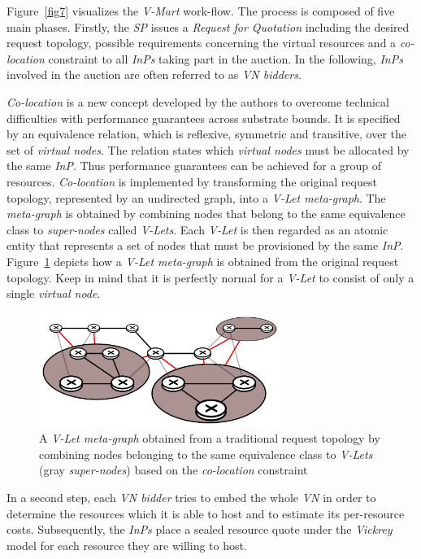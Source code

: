 \documentclass[prodmode,acmtomccap]{acmlarge}
\begin{document}
Figure~\ref{fig7} visualizes the \emph{V-Mart} work-flow. The process is composed of five main phases. 
Firstly, the \emph{SP} issues a \emph{Request for Quotation} including the desired request
topology, possible requirements concerning the virtual resources and a \emph{co-location} constraint to all \emph{InPs} taking part in the auction. In the following, \emph{InPs} involved in the auction
are often referred to as \emph{VN bidders}.

\emph{Co-location} is a new concept developed by the authors to overcome technical difficulties with
performance guarantees across substrate bounds. It is specified by an equivalence relation, which is reflexive, symmetric and transitive, over the set of \emph{virtual nodes}. The relation
states which \emph{virtual nodes} must be allocated by the same \emph{InP}. Thus  performance guarantees can be achieved for a group of resources. 
\emph{Co-location} is implemented by transforming the original request topology, represented by an undirected graph, into a \emph{V-Let meta-graph}. The \emph{meta-graph} is obtained
by combining nodes that belong to the same equivalence class to \emph{super-nodes} called \emph{V-Lets}. Each \emph{V-Let} is then regarded as an atomic entity that represents a set of nodes that must
be provisioned by the same \emph{InP}. Figure~\ref{fig8} depicts how a \emph{V-Let meta-graph} is obtained from the original request topology. Keep in mind that it is perfectly normal for a \emph{V-Let}
to consist of only a single \emph{virtual node}.

\begin{figure}[htb]
	\centering
	\includegraphics[width=0.7\textwidth]{colocation}
	\caption{A \emph{V-Let meta-graph} obtained from a traditional request topology by combining nodes belonging to the same equivalence class to \emph{V-Lets} (gray \emph{super-nodes}) based on the
		\emph{co-location} constraint}
	\label{fig8}
\end{figure}

In a second step, each \emph{VN bidder} tries to embed the whole \emph{VN} in order to determine the resources which it is able to host and to estimate its per-resource costs. Subsequently, 
the \emph{InPs} place a sealed resource quote under the \emph{Vickrey} model for each resource they are willing to host.
\end{document}
